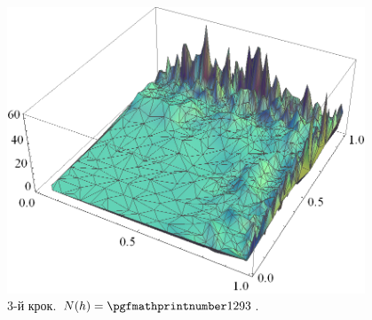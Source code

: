 \begin{frame}[allowframebreaks]
		\begin{figure}[H]
			\begin{columns}
			 	\begin{column}{0.7\textwidth}
			 		\includegraphics[width=\textwidth]{problem2/my/AEE/aee3}
			 	 \end{column}
			     \begin{column}{0.3\textwidth}
			     	\caption*{3-й крок. $N(h) = \nn{1293}$.}
			     \end{column}
		     \end{columns}
		\end{figure}


\end{frame}
